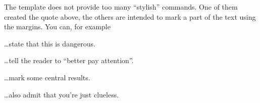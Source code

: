 
The template does not provide too many ``stylish'' commands. One of them created the quote above, the others are intended to mark a part of the text using the margins. You can, for example

\bigskip\bigskip
\dots state that this is dangerous.\MDanger

\bigskip\bigskip
\dots tell the reader to ``better pay attention''.\MAttention

\bigskip\bigskip
\dots mark some central results.\MHint

\bigskip\bigskip
\dots also admit that you're just clueless.\MQuestion







